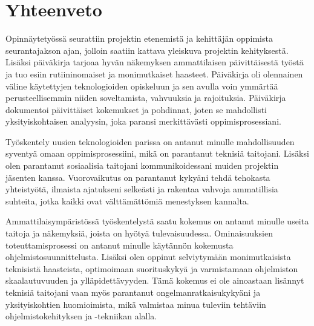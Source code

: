 \documentclass[11pt,a4paper,titlepage,oneside]{article}
\begin{document}
\newpage
{} %










\newpage
\section{Yhteenveto}             %



%




Opinnäytetyössä seurattiin projektin etenemistä ja kehittäjän oppimista seurantajakson ajan,
jolloin saatiin kattava yleiskuva projektin kehityksestä.
Lisäksi päiväkirja tarjoaa hyvän näkemyksen ammattilaisen päivittäisestä työstä ja tuo esiin rutiininomaiset ja monimutkaiset haasteet. 
Päiväkirja oli olennainen väline käytettyjen teknologioiden opiskeluun
ja sen avulla voin ymmärtää perusteellisemmin niiden soveltamista, vahvuuksia ja rajoituksia. 
Päiväkirja dokumentoi päivittäiset kokemukset ja pohdinnat,
joten se mahdollisti yksityiskohtaisen analyysin, joka paransi merkittävästi oppimisprosessiani.
\medskip





Työskentely uusien teknologioiden parissa on antanut minulle mahdollisuuden syventyä omaan oppimisprosessiini, 
mikä on parantanut teknisiä taitojani.
Lisäksi olen parantanut sosiaalisia taitojani kommunikoidessani muiden projektin jäsenten kanssa.
Vuorovaikutus on parantanut kykyäni tehdä tehokasta yhteistyötä,
ilmaista ajatukseni selkeästi ja rakentaa vahvoja ammatillisia suhteita,
jotka kaikki ovat välttämättömiä menestyksen kannalta. \\
\medskip



Ammattilaisympäristössä työskentelystä saatu kokemus on antanut minulle useita taitoja ja näkemyksiä, 
joista on hyötyä tulevaisuudessa.
Ominaisuuksien toteuttamisprosessi on antanut minulle käytännön kokemusta ohjelmistosuunnittelusta. 
Lisäksi olen oppinut selviytymään monimutkaisista teknisistä haasteista,
optimoimaan suorituskykyä ja varmistamaan ohjelmiston skaalautuvuuden ja ylläpidettävyyden.
Tämä kokemus ei ole ainoastaan lisännyt teknisiä taitojani vaan myös parantanut ongelmanratkaisukykyäni ja yksityiskohtien huomioimista, 
mikä valmistaa minua tuleviin tehtäviin ohjelmistokehityksen ja -tekniikan alalla.
\end{document}
